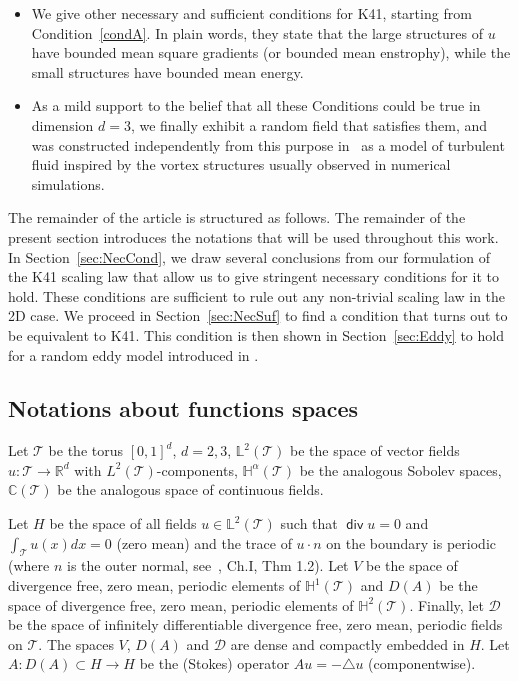 \documentclass[11pt]{preprint}
\DeclareMathOperator{\Div}{\mathsf{div}}
\begin{document}
\begin{itemize}
\item  We give other necessary and sufficient conditions for K41,
starting from Condition~\ref{condA}. In plain words, they state that the large
structures of $u$ have bounded mean square gradients (or bounded mean enstrophy), while the small
structures have bounded mean energy.

\item  As a mild support to the belief that all these Conditions could be true
in dimension $d=3$, we finally exhibit a random field that satisfies them, and
was constructed independently from this purpose in~\cite{FlaGub} as a model of
turbulent fluid inspired by the vortex structures usually observed in
numerical simulations.
\end{itemize}

The remainder of the article is structured as follows. The remainder of the present section
introduces the notations that will be used throughout this work. In Section~\ref{sec:NecCond},
we draw several conclusions  from our formulation of the K41 scaling law that allow us to
give stringent necessary conditions for it to hold. These conditions are sufficient to rule out
any non-trivial scaling law in the 2D case. We proceed in Section~\ref{sec:NecSuf} to
find a condition that turns out to be equivalent to K41. This condition is then shown
in Section~\ref{sec:Eddy} to hold for a random eddy model introduced in \cite{FlaGub}.


\subsection{Notations about functions spaces\label{section 1.1}}

Let $\mathcal{T}$ be the torus $\left[  0,1\right]  ^{d}$, $d=2,3$,
$\mathbb{L}^{2}\left(  \mathcal{T}\right)  $ be the space of vector fields
$u:\mathcal{T}\rightarrow\mathbb{R}^{d}$ with $L^{2}\left(  \mathcal{T}%
\right)  $-components, $\mathbb{H}^{\alpha}\left(  \mathcal{T}\right)  $ be
the analogous Sobolev spaces, $\mathbb{C}\left(  \mathcal{T}\right)  $ be the
analogous space of continuous fields.

Let $H$ be the space of all fields $u\in\mathbb{L}^{2}\left(  \mathcal{T}%
\right)  $ such that $\Div u=0$ and $\int_{\mathcal{T}}u\left(  x\right)
dx=0$ (zero mean) and the trace of $u\cdot
n $ on the boundary is periodic (where $n$ is the outer normal, see~\cite{Temam}, Ch.I, Thm 1.2). 
Let $V$ be the
space of divergence free, zero mean, periodic elements of $\mathbb{H}%
^{1}\left(  \mathcal{T}\right)  $ and $D(A)$ be the space of divergence free,
zero mean, periodic elements of $\mathbb{H}^{2}\left(  \mathcal{T}\right)  $.
Finally, let $\mathcal{D}$ be the space of infinitely differentiable
divergence free, zero mean, periodic fields on $\mathcal{T}$. The spaces $V$,
$D(A)$ and $\mathcal{D}$ are dense and compactly embedded in $H$. 
Let $A:D(A)\subset H\rightarrow H$ be the (Stokes) operator
$Au=-\triangle u$ (componentwise).
\end{document}
